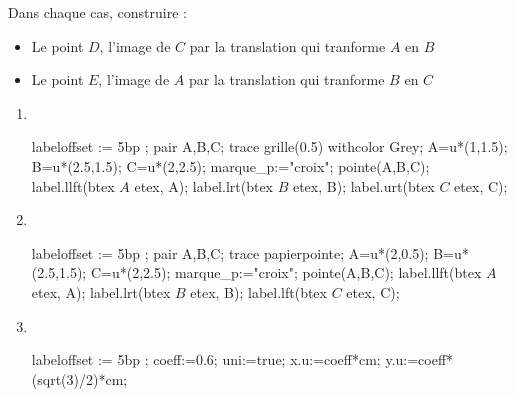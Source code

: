 \begin{exercice*}
    Dans chaque cas, construire :
    \begin{itemize}
        \item Le point $D$, l'image de $C$ par la translation qui tranforme $A$ en $B$
        \item Le point $E$, l'image de $A$ par la translation qui tranforme $B$ en $C$
    \end{itemize}
    \begin{changemargin}{0mm}{-15mm}
        \begin{multicols}{2}
            \begin{enumerate}
                \item \phantom{rrr}\\
                \begin{Geometrie}[CoinHD={(4u,4u)}]
                    labeloffset := 5bp ;
                    pair A,B,C;
                    trace grille(0.5) withcolor Grey;
                    A=u*(1,1.5);
                    B=u*(2.5,1.5);
                    C=u*(2,2.5);
                    marque_p:="croix";
                    pointe(A,B,C);
                    label.llft(btex $A$ etex, A);
                    label.lrt(btex $B$ etex, B);
                    label.urt(btex $C$ etex, C);
                \end{Geometrie}
                \item \phantom{rrr}\\
                \begin{Geometrie}[CoinHD={(4u,4u)}]
                    labeloffset := 5bp ;
                    pair A,B,C;
                    trace papierpointe;
                    A=u*(2,0.5);
                    B=u*(2.5,1.5);
                    C=u*(2,2.5);
                    marque_p:="croix";
                    pointe(A,B,C);
                    label.llft(btex $A$ etex, A);
                    label.lrt(btex $B$ etex, B);
                    label.lft(btex $C$ etex, C);
                \end{Geometrie}
                \columnbreak
                \item \phantom{rrr}\\
                \begin{Geometrie}[CoinHD={(4u,4u)}]
                    labeloffset := 5bp ;
                    coeff:=0.6;
                    uni:=true;
                    x.u:=coeff*cm;
                    y.u:=coeff*(sqrt(3)/2)*cm;

\end{Geometrie}
\end{enumerate}
\end{multicols}
\end{changemargin}
\end{exercice*}
